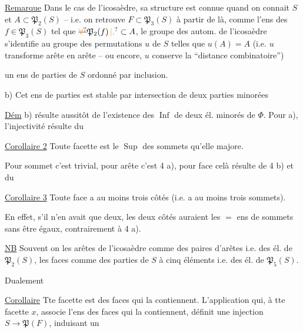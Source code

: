 \uline{Remarque} Dans le cas de l'icosaèdre, sa structure est connue quand on connait $S$ et $A\subset\mathfrak P_2(S)$ -- i.e. on retrouve $F\subset\mathfrak P_3(S)$ à partir de là, comme l'ens des $f\in\mathfrak P_3(S)$ tel que $\deleted{\unsure{\forall}}\mathfrak P_2(f)\unsure{\,|,}\subset A$,  le groupe des autom. de l'icosaèdre s'identifie au groupe des permutations $u$ de $S$ telles que $u(A)=A$ (i.e. $u$ transforme arête en arête -- ou encore, $u$ conserve la ``distance combinatoire'')




un ens de parties de $S$ ordonné par inclusion.

b)  Cet ens de parties est stable par intersection de deux parties minorées

\uline{Dém} b)  résulte aussitôt de l'existence des $\operatorname{Inf}$ de deux él. minorés de $\Phi$. Pour a), l'injectivité  résulte du

 \uline{Corollaire 2} Toute facette est le $\operatorname{Sup}$ des  sommets qu'elle majore.

Pour sommet c'est trivial, pour arête c'est 4 a), pour face celà résulte de 4 b) et du

\uline{Corollaire 3} Toute face a au moins trois côtés (i.e. a au moins trois sommets).

En effet, s'il n'en avait que deux, les deux côtés auraient les $=$ ens de sommets sans être égaux, contrairement à 4 a).

\uline{NB} Souvent on  les arêtes de l'icosaèdre comme des paires d'arêtes i.e. des él. de $\mathfrak P_2(S)$, les faces comme des parties de $S$ à cinq éléments i.e. des él. de $\mathfrak P_5(S)$.

Dualement

\uline{Corollaire} Tte facette est   des faces qui la contiennent. L'application qui, à tte facette $x$, associe l'ens des faces qui la contiennent, définit une injection $S\longrightarrow\mathfrak P(F)$, induisant un

